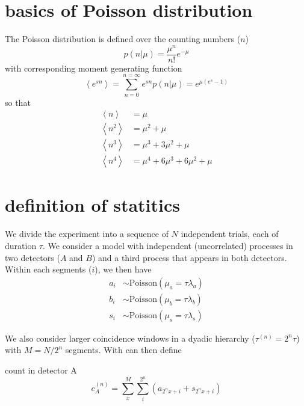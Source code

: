 \documentclass{article}
\begin{document}

\section*{basics of Poisson distribution}
\label{sec:poisson}

The Poisson distribution is defined over the counting numbers ($n$)
\begin{equation}
    p(n|\mu) = \frac{\mu^n}{n!}e^{-\mu}
\end{equation}
with corresponding moment generating function
\begin{equation}
    \left<e^{sn}\right> = \sum\limits_{n=0}^{n=\infty} e^{sn} p(n|\mu) = e^{\mu(e^s - 1)}
\end{equation}
so that
\begin{align}
    \left<n\right> & = \mu \\
    \left<n^2\right> & = \mu^2 + \mu \\
    \left<n^3\right> & = \mu^3 + 3\mu^2 + \mu \\
    \left<n^4\right> & = \mu^4 + 6\mu^3 + 6\mu^2 + \mu 
\end{align}


\section*{definition of statitics}
\label{sec:statistics}

We divide the experiment into a sequence of $N$ independent trials, each of duration $\tau$.
We consider a model with independent (uncorrelated) processes in two detectors ($A$ and $B$) and a third process that appears in both detectors.
Within each segments ($i$), we then have
\begin{align}
    a_i & \sim \textrm{Poisson}(\mu_a = \tau\lambda_a) \\
    b_i & \sim \textrm{Poisson}(\mu_b = \tau\lambda_b) \\
    s_i & \sim \textrm{Poisson}(\mu_s = \tau\lambda_s)
\end{align}

We also consider larger coincidence windows in a dyadic hierarchy ($\tau^{(n)} = 2^n \tau$) with $M = N/2^n$ segments.
With can then define

\noindent
count in detector A
\begin{equation}
    c_A^{(n)} = \sum\limits_x^M \sum\limits_i^{2^n} (a_{2^n x + i} + s_{2^n x + i})
\end{equation}
\end{document}

